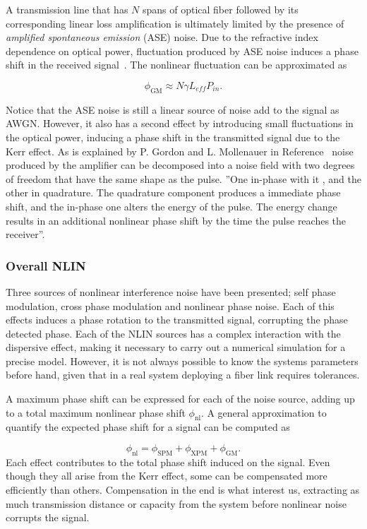 A transmission line that has $N$ spans of optical fiber followed by its corresponding  linear loss amplification is ultimately limited by the presence of \textit{amplified spontaneous emission} (ASE) noise. Due to the refractive index dependence on optical power, fluctuation produced by ASE noise induces a phase shift in the received signal~\cite{gordon1990phase}. The nonlinear  fluctuation  can be approximated as ~\cite{le2015advanced}    

\begin{equation}
\phi_{\text{GM}}\approx N\gamma L_{eff}P_{in}.
\end{equation}

Notice that the ASE noise is still a linear source of noise add to the signal as AWGN. However, it also has a second effect by introducing small fluctuations in the optical power, inducing a phase shift in the transmitted signal due to the Kerr effect. As is explained by P. Gordon and L. Mollenauer in Reference~\cite{gordon1990phase} noise produced by the amplifier can be decomposed into a noise field with two degrees of freedom that have the same shape as the pulse. ''One in-phase with it , and the other in quadrature. The quadrature component produces a immediate phase shift, and the in-phase one alters the energy of the pulse. The energy change results in an additional nonlinear phase shift by the time the pulse reaches the receiver''.
\subsubsection{Overall NLIN}

Three sources of nonlinear interference noise have  been presented; self phase modulation, cross phase modulation and nonlinear phase noise. Each of this effects induces a phase rotation to the transmitted signal, corrupting the phase detected phase. Each of the NLIN sources has a complex interaction with the dispersive effect, making it necessary to carry out a numerical simulation for a precise model. However, it is not always possible to know the systems parameters before hand, given that in a real system deploying a fiber link requires tolerances.

A maximum phase shift can be expressed for each of the noise source, adding  up to a total maximum nonlinear phase shift $\phi_{\text{nl}}$. A general approximation to quantify the expected phase shift for a signal can be computed as

\begin{equation}
\phi_{\text{nl}}=\phi_{\text{SPM}}+\phi_{\text{XPM}}+\phi_{\text{GM}}.
\end{equation} 
Each effect contributes to the total phase shift induced on the signal. Even though they all arise from the Kerr effect, some can be compensated more efficiently than others. Compensation in the end is what interest us, extracting as much transmission distance or capacity from the system before nonlinear noise corrupts the signal.  



